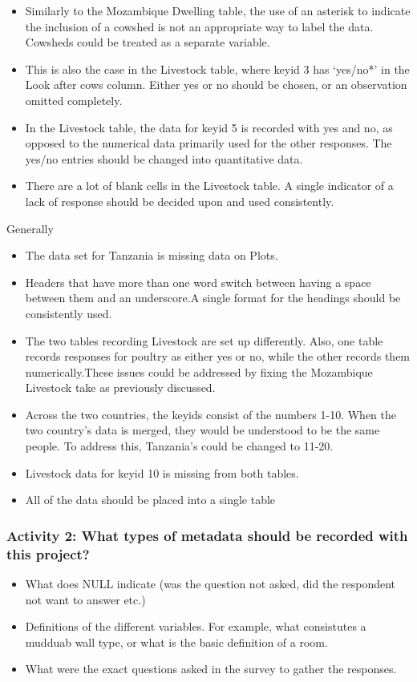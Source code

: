 \documentclass{article}
\begin{document}
\begin{FlushLeft}
\begin{itemize}
\item Similarly to the Mozambique Dwelling table, the use of an asterisk to indicate the inclusion of a cowshed is not an appropriate way to label the data. Cowsheds could be treated as a separate variable.
\item This is also the case in the Livestock table, where key\textunderscore id 3 has ‘yes/no*’ in the Look after cows column. Either yes or no should be chosen, or an observation omitted completely.
\item In the Livestock table, the data for key\textunderscore id 5 is recorded with yes and no, as opposed to the numerical data primarily used for the other responses. The yes/no entries should be changed into quantitative data.
\item There are a lot of blank cells in the Livestock table. A single indicator of a lack of response should be decided upon and used consistently.
\end{itemize}
Generally
\begin{itemize}
\item The data set for Tanzania is missing data on Plots.
\item Headers that have more than one word switch between having a space between them and an underscore.A single format for the headings should be consistently used.
\item The two tables recording Livestock are set up differently. Also, one table records responses for poultry as either yes or no, while the other records them numerically.These issues could be addressed by fixing the Mozambique Livestock take as previously discussed.
\item Across the two countries, the key\textunderscore ids consist of the numbers 1-10. When the two country’s data is merged, they would be understood to be the same people. To address this, Tanzania’s could be changed to 11-20.
\item Livestock data for key\textunderscore id 10 is missing from both tables.
\item All of the data should be placed into a single table
\end{itemize}
\subsubsection*{Activity 2: What types of metadata should be recorded with this project?}
\begin{itemize}
\item What does NULL indicate (was the question not asked, did the respondent not want to answer etc.) 
\item Definitions of the different variables. For example, what consistutes a mudduab wall type, or what is the basic definition of a room.
\item What were the exact questions asked in the survey to gather the responses.
\end{itemize}


\end{FlushLeft}
\end{document}
